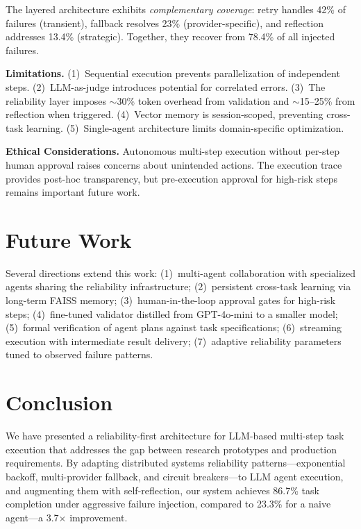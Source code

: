 \documentclass[conference]{IEEEtran}
\begin{document}
The layered architecture exhibits \textit{complementary coverage}: retry handles 42\% of failures (transient), fallback resolves 23\% (provider-specific), and reflection addresses 13.4\% (strategic). Together, they recover from 78.4\% of all injected failures.

\textbf{Limitations.} (1)~Sequential execution prevents parallelization of independent steps. (2)~LLM-as-judge introduces potential for correlated errors. (3)~The reliability layer imposes ${\sim}$30\% token overhead from validation and ${\sim}$15--25\% from reflection when triggered. (4)~Vector memory is session-scoped, preventing cross-task learning. (5)~Single-agent architecture limits domain-specific optimization.

\textbf{Ethical Considerations.} Autonomous multi-step execution without per-step human approval raises concerns about unintended actions. The execution trace provides post-hoc transparency, but pre-execution approval for high-risk steps remains important future work.

\section{Future Work}

Several directions extend this work: (1)~multi-agent collaboration with specialized agents sharing the reliability infrastructure; (2)~persistent cross-task learning via long-term FAISS memory; (3)~human-in-the-loop approval gates for high-risk steps; (4)~fine-tuned validator distilled from GPT-4o-mini to a smaller model; (5)~formal verification of agent plans against task specifications; (6)~streaming execution with intermediate result delivery; (7)~adaptive reliability parameters tuned to observed failure patterns.

\section{Conclusion}

We have presented a reliability-first architecture for LLM-based multi-step task execution that addresses the gap between research prototypes and production requirements. By adapting distributed systems reliability patterns---exponential backoff, multi-provider fallback, and circuit breakers---to LLM agent execution, and augmenting them with self-reflection, our system achieves 86.7\% task completion under aggressive failure injection, compared to 23.3\% for a naive agent---a 3.7$\times$ improvement.
\end{document}
